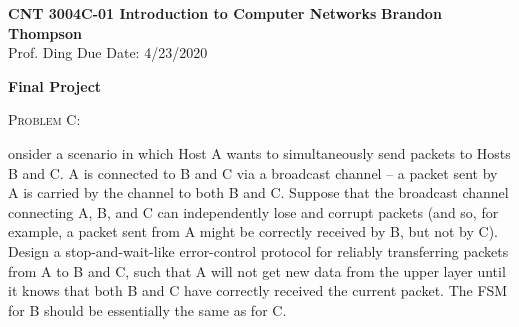 \documentclass[12pt]{article}
\newenvironment{problem}[1]
{\begin{mdframed}[linewidth=0.8pt]
        \textsc{Problem #1:}

}
    {\end{mdframed}}
\begin{document}
\noindent
\textbf{CNT 3004C-01 Introduction to Computer Networks} \hfill \textbf{Brandon Thompson} \\
\normalsize Prof. Ding \hfill Due Date: 4/23/2020 \\

\begin{center}
\textbf{Final Project}
\end{center}
	\begin{problem}
		Consider a scenario in which Host A wants to simultaneously send packets to Hosts B and C. A is connected to B and C via a broadcast channel -- a packet sent by A is carried by the channel to both B and C. Suppose that the broadcast channel connecting A, B, and C can independently lose and corrupt packets (and so, for example, a packet sent from A might be correctly received by B, but not by C). Design a stop-and-wait-like error-control protocol for reliably transferring packets from A to B and C, such that A will not get new data from the upper layer until it knows that both B and C have correctly received the current packet. The FSM for B should be essentially the same as for C.
	\end{problem}
\end{document}
